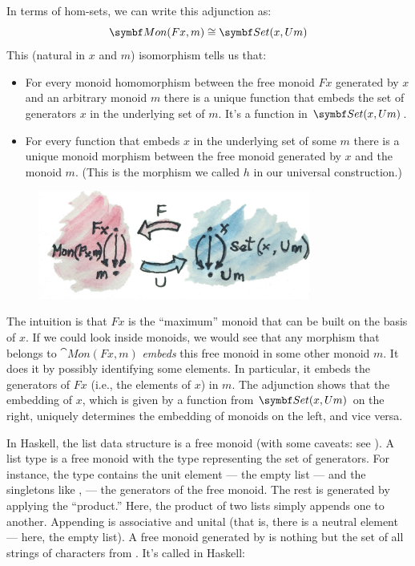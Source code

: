 \noindent
In terms of hom-sets, we can write this adjunction as:
\[\cat{Mon}(F x, m) \cong \Set(x, U m)\]
This (natural in $x$ and $m$) isomorphism tells us that:

\begin{itemize}
  \tightlist
  \item
        For every monoid homomorphism between the free monoid $F x$
        generated by $x$ and an arbitrary monoid $m$ there is a
        unique function that embeds the set of generators $x$ in the
        underlying set of $m$. It's a function in
        $\Set(x, U m)$.
  \item
        For every function that embeds $x$ in the underlying set of
        some $m$ there is a unique monoid morphism between the free
        monoid generated by $x$ and the monoid $m$. (This is the
        morphism we called $h$ in our universal construction.)
\end{itemize}

\begin{figure}[H]
  \centering
  \includegraphics[width=0.8\textwidth]{images/freemonadjunction.jpg}
\end{figure}

\noindent
The intuition is that $F x$ is the ``maximum'' monoid that can
be built on the basis of $x$. If we could look inside monoids, we
would see that any morphism that belongs to $\cat{Mon}(F x, m)$
\emph{embeds} this free monoid in some other monoid $m$. It does
it by possibly identifying some elements. In particular, it embeds the
generators of $F x$ (i.e., the elements of $x$) in
$m$. The adjunction shows that the embedding of $x$, which
is given by a function from $\Set(x, U m)$ on the right,
uniquely determines the embedding of monoids on the left, and vice
versa.

In Haskell, the list data structure is a free monoid (with some caveats:
see ). A list type \code{{[}a{]}} is a free monoid with
the type  representing the set of generators. For instance,
the type \code{{[}Char{]}} contains the unit element --- the empty
list \code{{[}{]}} --- and the singletons like
\code{{[}'a'{]}}, \code{{[}'b'{]}} --- the
generators of the free monoid. The rest is generated by applying the
``product.'' Here, the product of two lists simply appends one to
another. Appending is associative and unital (that is, there is a
neutral element --- here, the empty list). A free monoid generated by
 is nothing but the set of all strings of characters from
. It's called  in Haskell:

